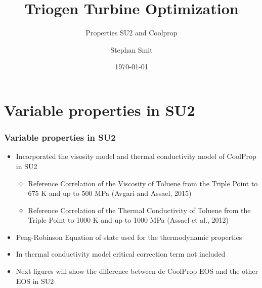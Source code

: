 \documentclass{beamer}
\title[Triogen Turbine Optimization]{Triogen Turbine Optimization}
\subtitle[Properties SU2 and Coolprop]{Properties SU2 and Coolprop}
\institute[TU Delft]{Delft University of Technology}
\author{Stephan Smit}
\date{\today}
\begin{document}
{
%
\frame{\titlepage}
}



\section{Variable properties in SU2}

\begin{frame}\frametitle{Variable properties in SU2}
	\begin{itemize}
		\item  Incorporated the visosity model and thermal conductivity model of CoolProp in SU2 
		\begin{itemize}
			\item Reference Correlation of the Viscosity of Toluene from the Triple Point to 675 K and up to 500 MPa (Avgari and Assael, 2015)
			\item Reference Correlation of the Thermal Conductivity of Toluene from the Triple Point to 1000 K and up to 1000 MPa (Assael et al., 2012)
		\end{itemize}
		\item  Peng-Robinson Equation of state used for the thermodynamic properties
		\item  In thermal conductivity model critical correction term not included
		\item  Next figures will show the difference between de CoolProp EOS and the other EOS in SU2
	\end{itemize}
\end{frame}
\end{document}
